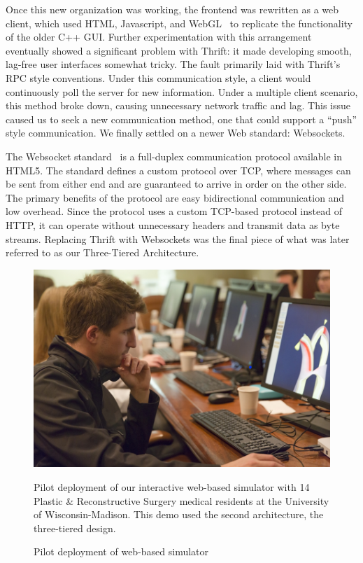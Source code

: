  Once this new organization was working, the frontend was rewritten as
 a web client, which used HTML, Javascript, and WebGL~\citep{webgl1.0}
 to replicate the functionality of the older C++ GUI. Further
 experimentation with this arrangement eventually showed a significant
 problem with Thrift: it made developing smooth, lag-free user
 interfaces somewhat tricky. The fault primarily laid with Thrift's
 RPC style conventions. Under this communication style, a client would
 continuously poll the server for new information. Under a multiple
 client scenario, this method broke down, causing unnecessary network
 traffic and lag.  This issue caused us to seek a new communication
 method, one that could support a ``push'' style communication. We
 finally settled on a newer Web standard: Websockets.

 The Websocket standard~\citep{rfc6455} is a full-duplex communication protocol
 available in HTML5. The standard defines a custom protocol over TCP, where
 messages can be sent from either end and are guaranteed to
 arrive in order on the other side. The primary benefits of the
 protocol are easy bidirectional communication and low overhead. Since
 the protocol uses a custom TCP-based protocol instead of HTTP, it can
 operate without unnecessary headers and transmit data as byte streams.
 Replacing Thrift with Websockets was the final piece of what was
 later referred to as our Three-Tiered Architecture.


\begin{figure}[t]
\includegraphics[width=\columnwidth]{chapter_gridiron/images/CS_SurgerySim.jpg}
\vspace*{-.18in}
\caption{Pilot deployment of web-based simulator}{Pilot deployment of
  our interactive web-based simulator with 14 Plastic \&
  Reconstructive Surgery medical residents at the University of
  Wisconsin-Madison. This demo used the second architecture, the
  three-tiered design.}
\vspace*{-.18in}
\label{fig:pilot}
\end{figure}
 
